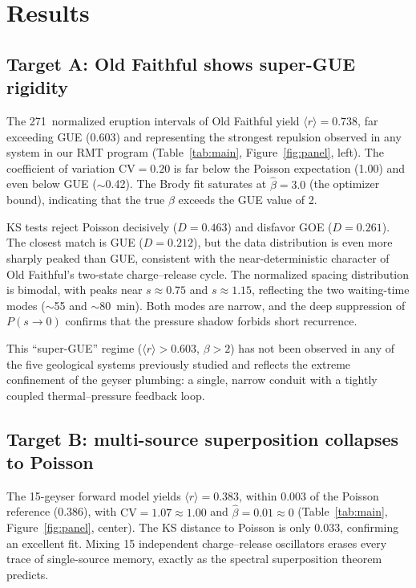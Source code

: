 \documentclass[12pt,a4paper]{article}
\begin{document}
\section{Results}

\subsection{Target A: Old Faithful shows super-GUE rigidity}

The 271~normalized eruption intervals of Old Faithful yield $\langle r\rangle=0.738$, far exceeding GUE (0.603) and representing the strongest repulsion observed in any system in our RMT program (Table~\ref{tab:main}, Figure~\ref{fig:panel}, left). The coefficient of variation $\mathrm{CV}=0.20$ is far below the Poisson expectation (1.00) and even below GUE ($\sim$0.42). The Brody fit saturates at $\hat\beta=3.0$ (the optimizer bound), indicating that the true $\beta$ exceeds the GUE value of 2.

KS tests reject Poisson decisively ($D=0.463$) and disfavor GOE ($D=0.261$). The closest match is GUE ($D=0.212$), but the data distribution is even more sharply peaked than GUE, consistent with the near-deterministic character of Old Faithful's two-state charge--release cycle. The normalized spacing distribution is bimodal, with peaks near $s\approx0.75$ and $s\approx1.15$, reflecting the two waiting-time modes ($\sim$55 and $\sim$80~min). Both modes are narrow, and the deep suppression of $P(s\to0)$ confirms that the pressure shadow forbids short recurrence.

This ``super-GUE'' regime ($\langle r\rangle>0.603$, $\beta>2$) has not been observed in any of the five geological systems previously studied and reflects the extreme confinement of the geyser plumbing: a single, narrow conduit with a tightly coupled thermal--pressure feedback loop.

\subsection{Target B: multi-source superposition collapses to Poisson}

The 15-geyser forward model yields $\langle r\rangle=0.383$, within 0.003 of the Poisson reference (0.386), with $\mathrm{CV}=1.07\approx1.00$ and $\hat\beta=0.01\approx0$ (Table~\ref{tab:main}, Figure~\ref{fig:panel}, center). The KS distance to Poisson is only 0.033, confirming an excellent fit. Mixing 15 independent charge--release oscillators erases every trace of single-source memory, exactly as the spectral superposition theorem predicts.
\end{document}

